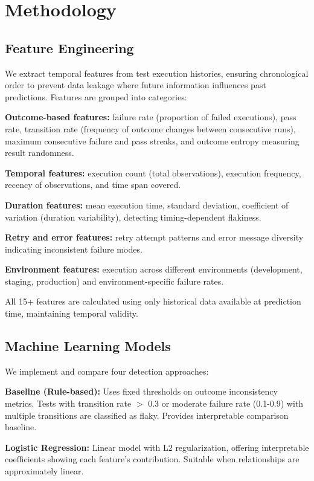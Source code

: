\documentclass[conference]{IEEEtran}
\begin{document}
\section{Methodology}

\subsection{Feature Engineering}
We extract temporal features from test execution histories, ensuring chronological order to prevent data leakage where future information influences past predictions. Features are grouped into categories:

\textbf{Outcome-based features:} failure rate (proportion of failed executions), pass rate, transition rate (frequency of outcome changes between consecutive runs), maximum consecutive failure and pass streaks, and outcome entropy measuring result randomness.

\textbf{Temporal features:} execution count (total observations), execution frequency, recency of observations, and time span covered.

\textbf{Duration features:} mean execution time, standard deviation, coefficient of variation (duration variability), detecting timing-dependent flakiness.

\textbf{Retry and error features:} retry attempt patterns and error message diversity indicating inconsistent failure modes.

\textbf{Environment features:} execution across different environments (development, staging, production) and environment-specific failure rates.

All 15+ features are calculated using only historical data available at prediction time, maintaining temporal validity.

\subsection{Machine Learning Models}
We implement and compare four detection approaches:

\textbf{Baseline (Rule-based):} Uses fixed thresholds on outcome inconsistency metrics. Tests with transition rate $>$ 0.3 or moderate failure rate (0.1-0.9) with multiple transitions are classified as flaky. Provides interpretable comparison baseline.

\textbf{Logistic Regression:} Linear model with L2 regularization, offering interpretable coefficients showing each feature's contribution. Suitable when relationships are approximately linear.
\end{document}

